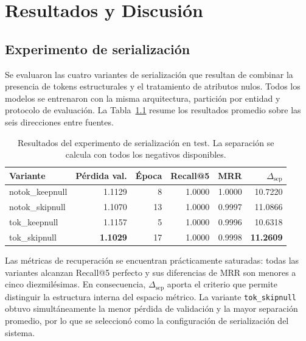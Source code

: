 
\chapter{Resultados y Discusión}
\label{ch:resultados}

\section{Experimento de serialización}

Se evaluaron las cuatro variantes de serialización que resultan de combinar la presencia de tokens estructurales y el tratamiento de atributos nulos. Todos los modelos se entrenaron con la misma arquitectura, partición por entidad y protocolo de evaluación. La Tabla~\ref{tab:serializacion_resultados} resume los resultados promedio sobre las seis direcciones entre fuentes.

\begin{table}[htbp]
    \centering
    \small
    \caption{Resultados del experimento de serialización en test. La separación se calcula con todos los negativos disponibles.}
    \label{tab:serializacion_resultados}
    \begin{tabular}{lrrrrr}
        \hline
        Variante & Pérdida val. & Época & Recall@5 & MRR & $\Delta_{\mathrm{sep}}$ \\
        \hline
        notok\_keepnull & 1.1129 & 8  & 1.0000 & 1.0000 & 10.7220 \\
        notok\_skipnull & 1.1070 & 13 & 1.0000 & 0.9997 & 11.0866 \\
        tok\_keepnull   & 1.1157 & 5  & 1.0000 & 0.9996 & 10.6318 \\
        tok\_skipnull   & \textbf{1.1029} & 17 & 1.0000 & 0.9998 & \textbf{11.2609} \\
        \hline
    \end{tabular}
\end{table}

Las métricas de recuperación se encuentran prácticamente saturadas: todas las variantes alcanzan Recall@5 perfecto y sus diferencias de MRR son menores a cinco diezmilésimas. En consecuencia, $\Delta_{\mathrm{sep}}$ aporta el criterio que permite distinguir la estructura interna del espacio métrico. La variante \texttt{tok\_skipnull} obtuvo simultáneamente la menor pérdida de validación y la mayor separación promedio, por lo que se seleccionó como la configuración de serialización del sistema.

